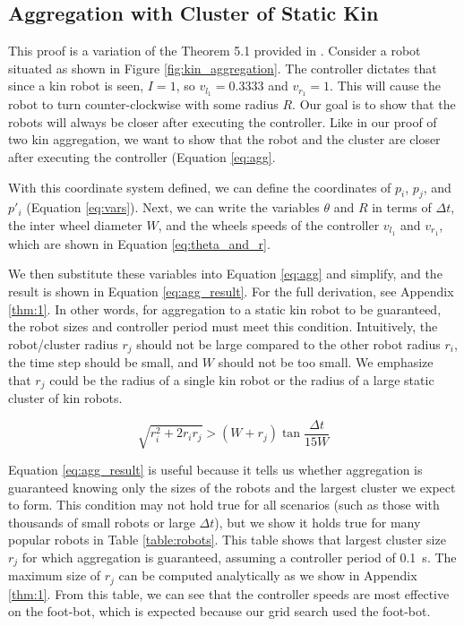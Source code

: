 \documentclass[conference]{IEEEtran}
\begin{document}
  \subsection{Aggregation with Cluster of Static Kin}

    This proof is a variation of the Theorem 5.1 provided in \cite{gauci_self-organized_2014}. Consider a robot situated as shown in Figure \ref{fig:kin_aggregation}. The controller dictates that since a kin robot is seen, $I=1$, so $v_{l_1} = 0.3333$ and $v_{r_1} = 1$. This will cause the robot to turn counter-clockwise with some radius $R$. Our goal is to show that the robots will always be closer after executing the controller. Like in our proof of two kin aggregation, we want to show that the robot and the cluster are closer after executing the controller (Equation \eqref{eq:agg}.

    With this coordinate system defined, we can define the coordinates of $p_i$, $p_j$, and $p'_i$ (Equation \eqref{eq:vars}). Next, we can write the variables $\theta$ and $R$ in terms of $\Delta t$, the inter wheel diameter $W$, and the wheels speeds of the controller $v_{l_1}$ and $v_{r_1}$, which are shown in Equation \eqref{eq:theta_and_r}.

    We then substitute these variables into Equation \eqref{eq:agg} and simplify, and the result is shown in Equation \eqref{eq:agg_result}. For the full derivation, see Appendix \ref{thm:1}. In other words, for aggregation to a static kin robot to be guaranteed, the robot sizes and controller period must meet this condition. Intuitively, the robot/cluster radius $r_j$ should not be large compared to the other robot radius $r_i$, the time step should be small, and $W$ should not be too small. We emphasize that $r_j$ could be the radius of a single kin robot or the radius of a large static cluster of kin robots.

    \begin{equation} \label{eq:agg_result}
      \sqrt{r^2_i + 2r_ir_j} > (W+r_j)\tan{\frac{\Delta t}{15W}}
    \end{equation}

    Equation \eqref{eq:agg_result} is useful because it tells us whether aggregation is guaranteed knowing only the sizes of the robots and the largest cluster we expect to form. This condition may not hold true for all scenarios (such as those with thousands of small robots or large $\Delta t$), but we show it holds true for many popular robots in Table \ref{table:robots}. This table shows that largest cluster size $r_j$ for which aggregation is guaranteed, assuming a controller period of \SI{0.1}{\second}. The maximum size of $r_j$ can be computed analytically as we show in Appendix \ref{thm:1}. From this table, we can see that the controller speeds are most effective on the foot-bot, which is expected because our grid search used the foot-bot.
\end{document}
